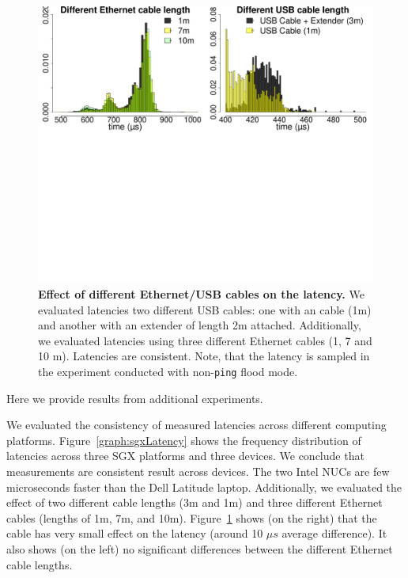 \begin{figure}[t]
  \centering
    \includegraphics[trim={0 18cm 0 0}, clip, width=\linewidth]{chapters/ProximiTEE/data/graph/CombinedCable_1.pdf}
    \caption[Effect of Different Ethernet/USB cables on the latency]{\textbf{Effect of different Ethernet/USB cables on the latency.} We evaluated latencies two different USB cables: one with an \usb cable (1m) and another with an \usb extender of length 2m attached. Additionally, we evaluated latencies using three different Ethernet cables (1, 7 and 10 m). Latencies are consistent. Note, that the latency is sampled in the experiment conducted with non-\texttt{ping} flood mode.}
    \label{graph:usbCableLength}
\end{figure}


Here we provide results from additional experiments.

We evaluated the consistency of measured latencies across different computing platforms. Figure~\ref{graph:sgxLatency} shows the frequency distribution of latencies across three SGX platforms and three \device devices. We conclude that measurements are consistent result across devices. The two Intel NUCs are few microseconds faster than the Dell Latitude laptop. Additionally, we evaluated the effect of two different \usb cable lengths (3m and 1m) and three different Ethernet cables (lengths of 1m, 7m, and 10m). Figure~\ref{graph:usbCableLength} shows (on the right) that the \usb cable has very small effect on the latency (around 10 $\mu s$ average difference). It also shows (on the left) no significant differences between the different Ethernet cable lengths. 


